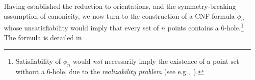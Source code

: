 Having established the reduction to orientations,
and the symmetry-breaking assumption of canonicity,
we now turn to the construction of a CNF formula $\phi_n$
whose unsatisfiability would imply
that every set of $n$ points
contains a $6$-hole.\footnote{
  Satisfiability of $\phi_n$ would \emph{not} necessarily imply
  the existence of a point set without a $6$-hole, due to the \emph{realizability problem} (see e.g.,~\cite{subercaseaux2023minimizing}).
}
The formula is detailed in~.




